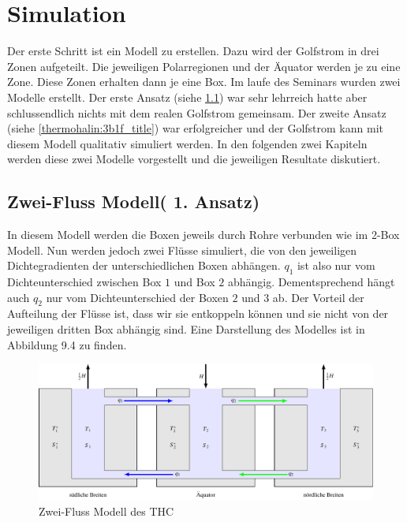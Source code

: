 \section{Simulation}

Der erste Schritt ist ein Modell zu erstellen.
Dazu wird der Golfstrom in drei Zonen aufgeteilt. Die jeweiligen Polarregionen und der Äquator werden je zu eine Zone. Diese Zonen erhalten dann je eine Box.
Im laufe des Seminars wurden zwei Modelle erstellt. Der erste Ansatz (siehe \ref{thermohalin:3b2f_title}) war sehr lehrreich hatte aber schlussendlich nichts mit dem realen Golfstrom gemeinsam. Der zweite Ansatz (siehe \ref{thermohalin:3b1f_title}) war erfolgreicher und der Golfstrom kann mit diesem Modell qualitativ simuliert werden.
In den folgenden zwei Kapiteln werden diese zwei Modelle vorgestellt und die jeweiligen Resultate diskutiert.

\subsection{Zwei-Fluss Modell( 1. Ansatz)}\label{thermohalin:3b2f_title}

In diesem Modell werden die Boxen jeweils durch Rohre verbunden wie im 2-Box Modell. Nun werden jedoch zwei Flüsse simuliert, die von den jeweiligen Dichtegradienten der unterschiedlichen Boxen abhängen. $q_1$ ist also nur vom Dichteunterschied zwischen Box $1$ und Box $2$ abhängig. Dementsprechend hängt auch $q_2$ nur vom Dichteunterschied der Boxen $2$ und $3$ ab.
Der Vorteil der Aufteilung der Flüsse ist, dass wir sie entkoppeln können und sie nicht von der jeweiligen dritten Box abhängig sind.
Eine Darstellung des Modelles ist in Abbildung 9.4 zu finden.

\begin{figure}
	\centering
	\includegraphics[width=14cm]{thermohalin/tikz/3b2f.pdf}
	\caption{Zwei-Fluss Modell des THC}
		\label{thermohalin:3b2f}
\end{figure}

